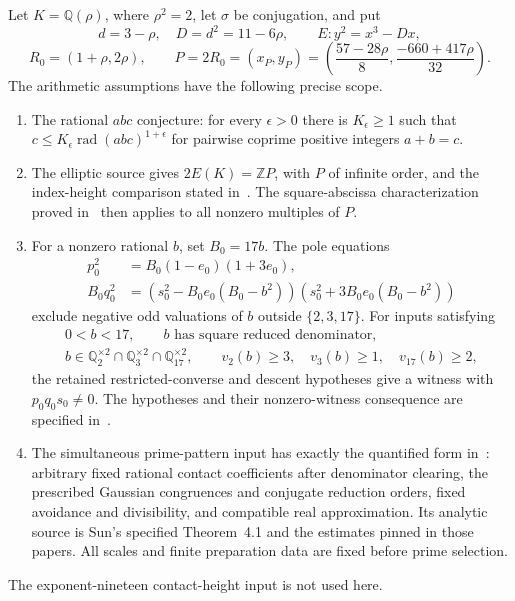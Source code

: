 \documentclass[11pt,a4paper]{article}
\newcommand{\Q}{\mathbb Q}\newcommand{\Z}{\mathbb Z}
\DeclareMathOperator{\rad}{rad}
\begin{document}
Let $K=\Q(\rho)$, where $\rho^2=2$, let $\sigma$ be conjugation, and put
\[
 d=3-\rho,\quad D=d^2=11-6\rho,\qquad E:y^2=x^3-Dx,
\]
\[
 R_0=(1+\rho,2\rho),\qquad
 P=2R_0=(x_P,y_P)
   =\left(\frac{57-28\rho}{8},\frac{-660+417\rho}{32}\right).
\]
The arithmetic assumptions have the following precise scope.
\begin{enumerate}
\item The rational $abc$ conjecture: for every $\epsilon>0$ there is
$K_\epsilon\ge1$ such that $c\le K_\epsilon\rad(abc)^{1+\epsilon}$
for pairwise coprime positive integers $a+b=c$.
\item The elliptic source gives $2E(K)=\Z P$, with $P$ of infinite
order, and the index-height comparison stated in~\cite{Dependencies}.
The square-abscissa characterization proved in~\cite{Squares} then
applies to all nonzero multiples of $P$.
\item For a nonzero rational $b$, set $B_0=17b$. The pole equations
\begin{equation}\label{eq:originalpole}
 \begin{split}
 p_0^2&=B_0(1-e_0)(1+3e_0),\\
 B_0q_0^2&=(s_0^2-B_0e_0(B_0-b^2))
                  (s_0^2+3B_0e_0(B_0-b^2))
 \end{split}
\end{equation}
exclude negative odd valuations of $b$ outside $\{2,3,17\}$.
For inputs satisfying
\begin{equation}\label{eq:prepared}
 \begin{gathered}
 0<b<17,\qquad b\text{ has square reduced denominator},\\
 b\in\Q_2^{\times2}\cap\Q_3^{\times2}\cap\Q_{17}^{\times2},
 \qquad v_2(b)\ge3,\quad v_3(b)\ge1,\quad v_{17}(b)\ge2,
 \end{gathered}
\end{equation}
the retained restricted-converse and descent hypotheses give a witness
with $p_0q_0s_0\ne0$. The hypotheses and their nonzero-witness consequence
are specified in~\cite{Dependencies,Source27,PoleDensity}.
\item The simultaneous prime-pattern input has exactly the quantified
form in~\cite{Dependencies,Selection}: arbitrary fixed rational contact
coefficients after denominator clearing, the prescribed Gaussian
congruences and conjugate reduction orders, fixed avoidance and
divisibility, and compatible real approximation. Its analytic source is
Sun's specified Theorem~4.1 and the estimates pinned in those papers.
All scales and finite preparation data are fixed before prime selection.
\end{enumerate}
The exponent-nineteen contact-height input is not used here.
\end{document}
